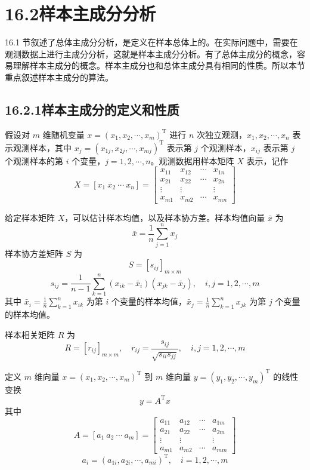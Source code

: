 \documentclass[UTF8, 12pt, fontset=fandol, oneside]{ctexart}
\begin{document}
\section*{16.2\quad 样本主成分分析}

16.1 节叙述了总体主成分分析，是定义在样本总体上的。在实际问题中，需要在观测数据上进行主成分分析，这就是样本主成分分析。有了总体主成分的概念，容易理解样本主成分的概念。样本主成分也和总体主成分具有相同的性质。所以本节重点叙述样本主成分的算法。

\subsection*{16.2.1\quad 样本主成分的定义和性质}

假设对 $m$ 维随机变量 $x=(x_1,x_2,\cdots,x_m)^{\mathrm{T}}$ 进行 $n$ 次独立观测，$x_1,x_2,\cdots,x_n$ 表示观测样本，其中 $x_j=(x_{1j},x_{2j},\cdots,x_{mj})^{\mathrm{T}}$ 表示第 $j$ 个观测样本，$x_{ij}$ 表示第 $j$ 个观测样本的第 $i$ 个变量，$j=1,2,\cdots,n$。观测数据用样本矩阵 $X$ 表示，记作
\begin{equation}
X=[x_1\ x_2\ \cdots\ x_n]=
\begin{bmatrix}
x_{11} & x_{12} & \cdots & x_{1n}\\
x_{21} & x_{22} & \cdots & x_{2n}\\
\vdots & \vdots & & \vdots\\
x_{m1} & x_{m2} & \cdots & x_{mn}
\end{bmatrix}
\tag{16.39}
\end{equation}

给定样本矩阵 $X$，可以估计样本均值，以及样本协方差。样本均值向量 $\bar x$ 为
\begin{equation}
\bar x=\frac{1}{n}\sum_{j=1}^n x_j
\tag{16.40}
\end{equation}
样本协方差矩阵 $S$ 为
\[
S=[s_{ij}]_{m\times m}
\]
\begin{equation}
s_{ij}=\frac{1}{n-1}\sum_{k=1}^n(x_{ik}-\bar x_i)(x_{jk}-\bar x_j),\quad i,j=1,2,\cdots,m
\tag{16.41}
\end{equation}
其中 $\bar x_i=\frac{1}{n}\sum_{k=1}^n x_{ik}$ 为第 $i$ 个变量的样本均值，$\bar x_j=\frac{1}{n}\sum_{k=1}^n x_{jk}$ 为第 $j$ 个变量的样本均值。

样本相关矩阵 $R$ 为
\begin{equation}
R=[r_{ij}]_{m\times m},\quad r_{ij}=\frac{s_{ij}}{\sqrt{s_{ii}s_{jj}}},\quad i,j=1,2,\cdots,m
\tag{16.42}
\end{equation}

定义 $m$ 维向量 $x=(x_1,x_2,\cdots,x_m)^{\mathrm{T}}$ 到 $m$ 维向量 $y=(y_1,y_2,\cdots,y_m)^{\mathrm{T}}$ 的线性变换
\begin{equation}
y=A^{\mathrm{T}}x
\tag{16.43}
\end{equation}
其中
\[
A=[a_1\ a_2\ \cdots\ a_m]=
\begin{bmatrix}
a_{11} & a_{12} & \cdots & a_{1m}\\
a_{21} & a_{22} & \cdots & a_{2m}\\
\vdots & \vdots & & \vdots\\
a_{m1} & a_{m2} & \cdots & a_{mm}
\end{bmatrix}
\]
\[
a_i=(a_{1i},a_{2i},\cdots,a_{mi})^{\mathrm{T}},\quad i=1,2,\cdots,m
\]
\end{document}
